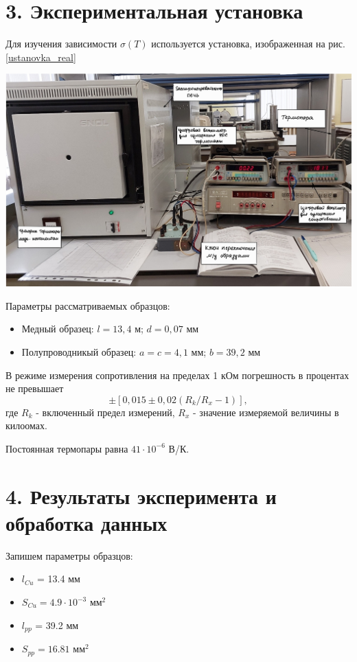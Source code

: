 \documentclass[a4paper,12pt]{report}
\begin{document}
\section*{3. Экспериментальная установка}

Для изучения зависимости $\sigma(T)$ используется установка, изображенная на рис.\ref{ustanovka_real}

\begin{center}
    \includegraphics[width = 0.7 \linewidth]{ustanovka.jpg}
    \label{ustanovka_real}
\end{center}

Параметры рассматриваемых образцов: 
\begin{itemize}
    \item Медный образец: $l = 13,4$ м; $d = 0,07$ мм 
    \item Полупроводникый образец: $a = c = 4,1$ мм; $b = 39,2$ мм
\end{itemize}

В режиме измерения сопротивления на пределах 1 кОм погрешность в процентах не превышает 
\begin{equation*}
    \pm[0,015\pm0,02(R_{k}/R_{x} - 1)],
\end{equation*}
где $R_{k}$ - включенный предел измерений, $R_{x}$ - значение измеряемой величины в килоомах.

Постоянная термопары равна $41 \cdot 10^{-6}$ В/К.

\section*{4. Результаты эксперимента и обработка данных}

Запишем параметры образцов:
\begin{itemize}
    \item $l_{Cu}$ = 13.4 мм
    \item $S_{Cu} = 4.9 \cdot 10^{-3} \text{ мм}^{2}$
    \item $l_{pp}$ = 39.2 мм
    \item $S_{pp} = 16.81 \text{ мм}^{2}$
\end{itemize}
\end{document}
